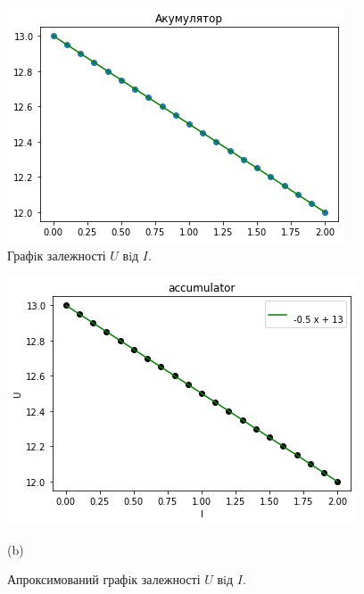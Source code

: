 \documentclass[a4paper,12pt]{article}
\begin{document}
\newpage
	\begin{figure}[h]
		\centering
		\begin{minipage}[h]{0.5\linewidth}
			\includegraphics[width=1\linewidth]{Prt sc/Figure_2_1.jpeg}  
		\end{minipage}
		\caption{Графiк залежності $U$ вiд $I$.}
	\end{figure}
	\begin{figure}[h]
		\centering
		\begin{minipage}[h]{0.5\linewidth}
			\includegraphics[width=1\linewidth]{Prt sc/Figure_2_2.jpeg} \begin{center}(b)\end{center}
		\end{minipage}
		\caption{Апроксимований графiк залежності $U$ вiд $I$.}
	\end{figure}
	
\end{document}

